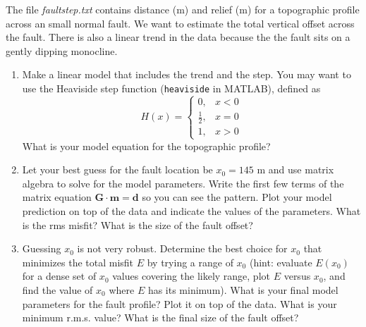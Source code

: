 \begin{problem}
The file \emph{faultstep.txt} contains distance (m) and relief (m) for a topographic profile across
an small normal fault.  We want to estimate the total vertical offset across the fault.  There is also a
linear trend in the data because the the fault sits on a gently dipping monocline.
\begin{enumerate}[label=\alph*)]
\item  Make a linear model that includes the trend and the step.  You may want to use the Heaviside 
step function (\texttt{heaviside} in MATLAB), defined as
$$
H(x) = \left \{ \begin{array}{rr} 
0, & x < 0 \\
\frac{1}{2}, & x = 0 \\
1, & x > 0
\end{array} \right.
$$
What is your model equation for the topographic profile?
\item  Let your best guess for the fault location be $x_0 = 145$ m and use matrix algebra
to solve for the model parameters.  Write the first few terms of the matrix equation
$\mathbf{G \cdot m = d}$ so you can see the pattern.  
Plot your model prediction on top of the data and indicate the values of the parameters.  What is the
rms misfit? What is the size of the fault offset?
\item  Guessing $x_0$ is not very robust.  Determine the best choice for $x_0$ that minimizes the total 
misfit $E$ by trying a range of $x_0$ (hint: evaluate $E(x_0)$ for a dense set of $x_0$ values
covering the likely range, plot $E$ versus $x_0$, and find the value of $x_0$ where $E$ has its minimum).
What is your final model parameters for the fault profile? Plot it on top of the data.
What is your minimum r.m.s. value?  What is the final size of the fault offset?
\end{enumerate}
\end{problem}

